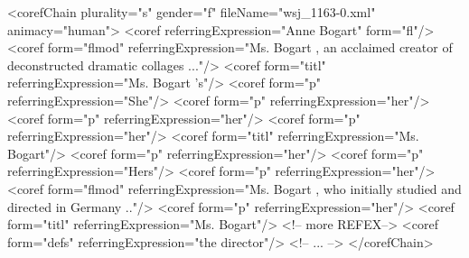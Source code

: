 <corefChain plurality="s" gender="f" fileName="wsj_1163-0.xml" animacy="human">
    <coref referringExpression="Anne Bogart" form="fl"/>
    <coref form="flmod" referringExpression="Ms. Bogart , an acclaimed creator 
    of deconstructed dramatic collages ..."/>
    <coref form="titl" referringExpression="Ms. Bogart 's"/>
    <coref form="p" referringExpression="She"/>
    <coref form="p" referringExpression="her"/>
    <coref form="p" referringExpression="her"/>
    <coref form="p" referringExpression="her"/>
    <coref form="titl" referringExpression="Ms. Bogart"/>
    <coref form="p" referringExpression="her"/>
    <coref form="p" referringExpression="Hers"/>
    <coref form="p" referringExpression="her"/>
    <coref form="flmod" referringExpression="Ms. Bogart , who initially studied
    and directed in Germany .."/>
    <coref form="p" referringExpression="her"/>
    <coref form="titl" referringExpression="Ms. Bogart"/>
    <!-- more REFEX-->
    <coref form="defs" referringExpression="the director"/>
    <!-- ... -->
</corefChain>